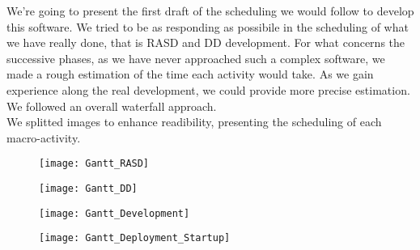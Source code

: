We're going to present the first draft of the scheduling we would follow to develop this software. We tried to be as responding as possibile in the scheduling of what we have really done, that is RASD and DD development. For what concerns the successive phases, as we have never approached such a complex software, we made a rough estimation of the time each activity would take. As we gain experience along the real development, we could provide more precise estimation. We followed an overall waterfall approach.\\
We splitted images to enhance readibility, presenting the scheduling of each macro-activity.\\

\begin{figure}
\centering
\vspace*{-4cm}\texttt{[image: Gantt\_RASD]}
\end{figure}
\begin{figure}
\centering
\vspace*{-4cm}\texttt{[image: Gantt\_DD]}
\end{figure}
\begin{figure}
\centering
\vspace*{-4cm}\texttt{[image: Gantt\_Development]}
\end{figure}
\begin{figure}
\centering
\vspace{-4cm}\texttt{[image: Gantt\_Deployment\_Startup]}
\end{figure}
